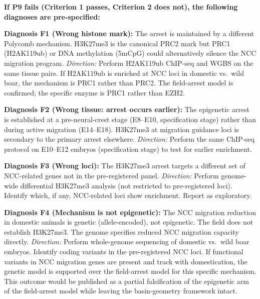 \documentclass[10pt, a4paper]{article}
\begin{document}
\begin{mdframed}[
  backgroundcolor=failbox,
  linecolor=red!50!black,
  linewidth=0.8pt,
  innertopmargin=0.5em,
  innerbottommargin=0.5em,
  innerleftmargin=0.8em,
  innerrightmargin=0.8em
]
\textbf{If P9 fails (Criterion 1 passes,
Criterion 2 does not), the following
diagnoses are pre-specified:}

\medskip
\textbf{Diagnosis F1 (Wrong histone mark):}
The arrest is maintained by a different
Polycomb mechanism. H3K27me3 is the
canonical PRC2 mark but PRC1 (H2AK119ub)
or DNA methylation (5mCpG) could
alternatively silence the NCC migration
program.
\textit{Direction:} Perform H2AK119ub
ChIP-seq and WGBS on the same tissue pairs.
If H2AK119ub is enriched at NCC loci in
domestic vs.\ wild boar, the mechanism is
PRC1 rather than PRC2. The field-arrest
model is confirmed; the specific enzyme
is PRC1 rather than EZH2.

\medskip
\textbf{Diagnosis F2 (Wrong tissue:
arrest occurs earlier):}
The epigenetic arrest is established at
a pre-neural-crest stage (E8--E10,
specification stage) rather than during
active migration (E14--E18). H3K27me3
at migration guidance loci is secondary
to the primary arrest elsewhere.
\textit{Direction:} Perform the same
ChIP-seq protocol on E10--E12 embryos
(specification stage) to test for
earlier enrichment.

\medskip
\textbf{Diagnosis F3 (Wrong loci):}
The H3K27me3 arrest targets a different
set of NCC-related genes not in the
pre-registered panel.
\textit{Direction:} Perform genome-wide
differential H3K27me3 analysis (not
restricted to pre-registered loci).
Identify which, if any, NCC-related loci
show enrichment. Report as exploratory.

\medskip
\textbf{Diagnosis F4 (Mechanism is not
epigenetic):}
The NCC migration reduction in domestic
animals is genetic (allele-encoded),
not epigenetic. The field does not
establish H3K27me3. The genome specifies
reduced NCC migration capacity directly.
\textit{Direction:} Perform whole-genome
sequencing of domestic vs.\ wild boar
embryos. Identify coding variants in
the pre-registered NCC loci. If
functional variants in NCC migration
genes are present and track with
domestication, the genetic model is
supported over the field-arrest model
for this specific mechanism.
This outcome would be published as
a partial falsification of the
epigenetic arm of the field-arrest model
while leaving the basin-geometry
framework intact.
\end{mdframed}
\end{document}
